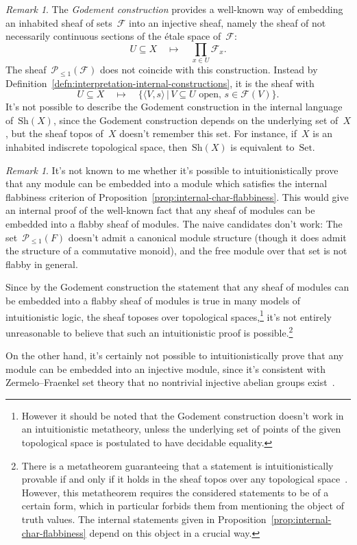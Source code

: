 \documentclass[10pt,reqno,a4paper]{amsbook}
\theoremstyle{definition}
\theoremstyle{plain}
\theoremstyle{remark}
\newtheorem{rem}[defn]{Remark}
\newcommand{\F}{\mathcal{F}}
\renewcommand{\P}{\mathcal{P}}
\newcommand{\Set}{\mathrm{Set}}
\newcommand{\Sh}{\mathrm{Sh}}
\newcommand{\?}{\,{:}\,}
\renewcommand{\_}{\mathpunct{.}\,}
\begin{document}
\begin{rem}\label{rem:godement-construction}
The \emph{Godement construction} provides a well-known way of embedding an
inhabited sheaf of sets~$\F$ into an injective sheaf, namely
the sheaf of not necessarily continuous sections of the étale space of~$\F$:
\[ U \subseteq X \quad\longmapsto\quad
  \prod_{x \in U} \F_x. \]
The sheaf~$\P_{\leq1}(\F)$ does not coincide with this construction.
Instead by Definition~\ref{defn:interpretation-internal-constructions}, it is the sheaf with
\[ U \subseteq X \quad\longmapsto\quad
  \{ \langle V, s \rangle \,|\,
    \text{$V \subseteq U$ open, $s \in \F(V)$} \}. \]
It's not possible to describe the Godement construction in the internal language
of~$\Sh(X)$, since the Godement construction depends on the underlying set of~$X$,
but the sheaf topos of~$X$ doesn't remember this set. For instance, if~$X$
is an inhabited indiscrete topological space, then~$\Sh(X)$ is equivalent
to~$\Set$.
\end{rem}

\begin{rem}It's not known to me whether it's possible to intuitionistically
prove that any module can be embedded into a module which satisfies the internal
flabbiness criterion of Proposition~\ref{prop:internal-char-flabbiness}. This
would give an internal proof of the well-known fact that any sheaf of modules can be embedded into a
flabby sheaf of modules. The naive candidates don't work: The
set~$\P_{\leq1}(F)$ doesn't admit a canonical module structure (though it does admit the structure of a commutative monoid), and the free
module over that set is not flabby in general.

Since by the Godement construction the statement that any sheaf of modules can
be embedded into a flabby sheaf of modules is true in many models of
intuitionistic logic, the sheaf toposes over topological
spaces,\footnote{However it should be noted that the Godement construction
doesn't work in an intuitionistic metatheory, unless the underlying set of
points of the given topological space is postulated to have decidable
equality.}
it's not entirely unreasonable to believe
that such an intuitionistic proof is possible.\footnote{There is a metatheorem
guaranteeing that a statement is intuitionistically provable if and only if it
holds in the sheaf topos over any topological
space~\cite[Theorem~B]{awodey-butz:completeness}. However, this metatheorem
requires the considered statements to be of a certain form, which in particular
forbids them from mentioning the object of truth values. The internal
statements given in Proposition~\ref{prop:internal-char-flabbiness} depend on
this object in a crucial way.}

On the other hand, it's certainly not possible to intuitionistically prove that
any module can be embedded into an injective module, since it's consistent with
Zermelo--Fraenkel set theory that no nontrivial injective abelian groups
exist~\cite{blass:inj-proj-axc}.
\end{rem}
\end{document}
